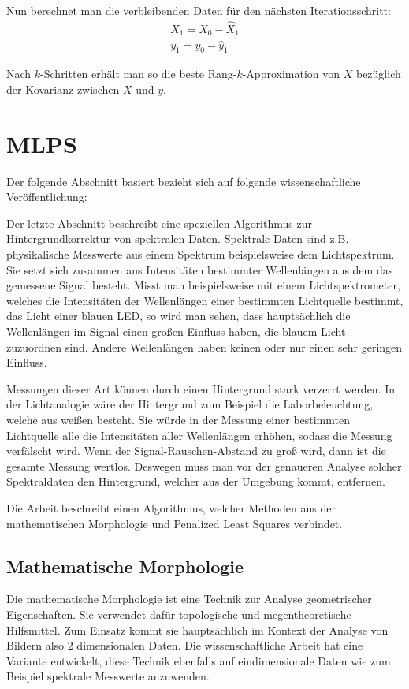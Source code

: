 \documentclass{article}
\begin{document}
Nun berechnet man die verbleibenden Daten für den nächsten Iterationsschritt:
\begin{align*}
    X_1 = X_0 - \hat{X}_1 \\
    y_1 = y_0 - \hat{y}_1
\end{align*}

Nach $k$-Schritten erhält man so die beste Rang-$k$-Approximation von $X$ bezüglich der Kovarianz zwischen $X$ und $y$.
\cite{AMAW}

\section{MLPS}
Der folgende Abschnitt basiert bezieht sich auf folgende wissenschaftliche Veröffentlichung: \cite{li2013morphological}
\break

Der letzte Abschnitt beschreibt eine speziellen Algorithmus zur Hintergrundkorrektur von spektralen Daten.
Spektrale Daten sind z.B. physikalische Messwerte aus einem Spektrum beispielsweise dem Lichtspektrum. 
Sie setzt sich zusammen aus Intensitäten bestimmter Wellenlängen aus dem das gemessene Signal besteht. 
Misst man beispielsweise mit einem Lichtspektrometer, welches die Intensitäten der Wellenlängen einer bestimmten Lichtquelle bestimmt, das Licht einer blauen LED,
so wird man sehen, dass hauptsächlich die Wellenlängen im Signal einen großen Einfluss haben, die blauem Licht zuzuordnen sind. Andere Wellenlängen haben keinen oder nur einen sehr geringen Einfluss.

Messungen dieser Art können durch einen Hintergrund stark verzerrt werden. In der Lichtanalogie wäre der Hintergrund zum Beispiel die Laborbeleuchtung, welche aus weißen besteht. 
Sie würde in der Messung einer bestimmten Lichtquelle alle die Intensitäten aller Wellenlängen erhöhen, sodass die Messung verfälscht wird.
Wenn der Signal-Rauschen-Abstand zu groß wird, dann ist die gesamte Messung wertlos. Deswegen muss man vor der genaueren Analyse solcher Spektraldaten den Hintergrund, welcher aus der Umgebung kommt, entfernen.

Die Arbeit beschreibt einen Algorithmus, welcher Methoden aus der mathematischen Morphologie und Penalized Least Squares verbindet.

\subsection{Mathematische Morphologie} 
Die mathematische Morphologie ist eine Technik zur Analyse geometrischer Eigenschaften.
Sie verwendet dafür topologische und megentheoretische Hilfsmittel. Zum Einsatz kommt sie hauptsächlich im Kontext der Analyse von Bildern also 2 dimensionalen Daten.
Die wissenschaftliche Arbeit hat eine Variante entwickelt, diese Technik ebenfalls auf eindimensionale Daten wie zum Beispiel spektrale Messwerte anzuwenden.
\end{document}

